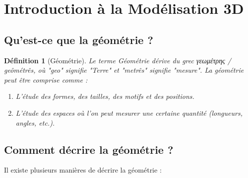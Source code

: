 \documentclass{article}
\newtheorem{definition}{Définition} %
\begin{document}
\sloppy

\section{Introduction à la Modélisation 3D}

\subsection{Qu'est-ce que la géométrie ?}

\begin{definition}[Géométrie]
Le terme \textit{Géométrie} dérive du grec γεωμέτρης / geômétrês, où "geo" signifie "Terre" et "metrês" signifie "mesure". La géométrie peut être comprise comme :
\begin{enumerate}
    \item L'étude des formes, des tailles, des motifs et des positions.
    \item L'étude des espaces où l'on peut mesurer une certaine quantité (longueurs, angles, etc.).
\end{enumerate}
\end{definition}

\subsection{Comment décrire la géométrie ?}

Il existe plusieurs manières de décrire la géométrie :
\end{document}
